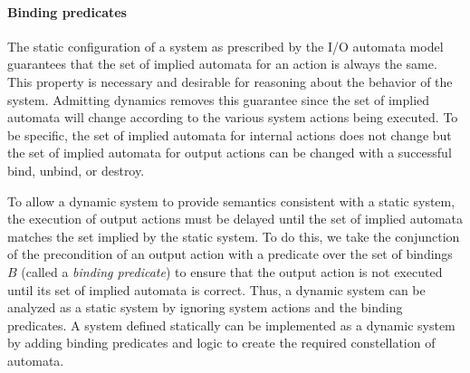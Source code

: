 

\paragraph*{Binding predicates}
The static configuration of a system as prescribed by the I/O automata model guarantees that the set of implied automata for an action is always the same.
This property is necessary and desirable for reasoning about the behavior of the system.
Admitting dynamics removes this guarantee since the set of implied automata will change according to the various system actions being executed.
To be specific, the set of implied automata for internal actions does not change but the set of implied automata for output actions can be changed with a successful bind, unbind, or destroy.

To allow a dynamic system to provide semantics consistent with a static system, the execution of output actions must be delayed until the set of implied automata matches the set implied by the static system.
To do this, we take the conjunction of the precondition of an output action with a predicate over the set of bindings $B$ (called a \emph{binding predicate}) to ensure that the output action is not executed until its set of implied automata is correct.
Thus, a dynamic system can be analyzed as a static system by ignoring system actions and the binding predicates.
A system defined statically can be implemented as a dynamic system by adding binding predicates and logic to create the required constellation of automata.

